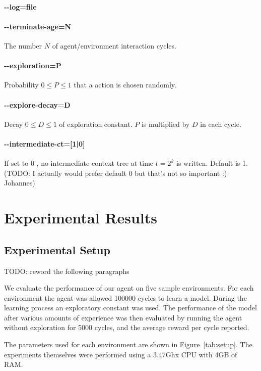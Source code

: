 \documentclass[paper=a4, fontsize=11pt]{scrartcl} %
\numberwithin{equation}{section} %
\numberwithin{figure}{section} %
\numberwithin{table}{section} %
\begin{document}
\paragraph{-{}-log=file}
\paragraph{-{}-terminate-age=N} The number $N$ of agent/environment interaction cycles.
\paragraph{-{}-exploration=P} Probability $0 \leq P \leq 1$ that a action is chosen randomly.
\paragraph{-{}-explore-decay=D} Decay $0 \leq D \leq 1$ of exploration constant. $P$ is multiplied by $D$ in each cycle.
\paragraph{-{}-intermediate-ct=[1|0]} If set to 0 , no intermediate context tree at time $t=2^k$ is written. Default is 1. (TODO: I actually would prefer default 0 but that's not so important :)  Johannes)


\section{\label{results}Experimental Results}
\subsection{Experimental Setup}
TODO: reword the following paragraphs

We evaluate the performance of our agent on five sample environments. For each environment the agent was allowed 100000 cycles to learn a model. During the learning process an exploratory constant was used. The performance of the model after various amounts of experience was then evaluated by running the agent without exploration for 5000 cycles, and the average reward per cycle reported.

The parameters used for each environment are shown in Figure~\ref{tab:setup}. The experiments themselves were performed using a 3.47Ghx CPU with 4GB of RAM.
\end{document}
